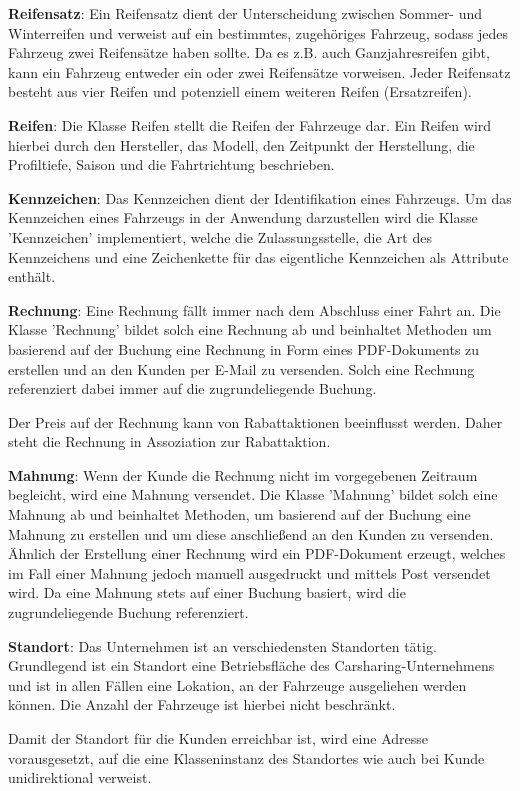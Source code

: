\textbf{Reifensatz}: Ein Reifensatz dient der Unterscheidung zwischen Sommer- und Winterreifen und verweist auf ein bestimmtes, zugehöriges Fahrzeug, sodass jedes Fahrzeug zwei Reifensätze haben sollte. Da es z.B. auch Ganzjahresreifen gibt, kann ein Fahrzeug entweder ein oder zwei Reifensätze vorweisen.  
Jeder Reifensatz besteht aus vier Reifen und potenziell einem weiteren Reifen (Ersatzreifen).

\textbf{Reifen}: Die Klasse Reifen stellt die Reifen der Fahrzeuge dar. Ein Reifen wird hierbei durch den Hersteller, das Modell, den Zeitpunkt der Herstellung, die Profiltiefe, Saison und die Fahrtrichtung beschrieben.

\textbf{Kennzeichen}: Das Kennzeichen dient der Identifikation eines Fahrzeugs. Um das Kennzeichen eines Fahrzeugs in der Anwendung darzustellen wird die Klasse 'Kennzeichen' implementiert, welche die Zulassungsstelle, die Art des Kennzeichens und eine Zeichenkette für das eigentliche Kennzeichen als Attribute enthält.

\textbf{Rechnung}: Eine Rechnung fällt immer nach dem Abschluss einer Fahrt an. Die Klasse 'Rechnung' bildet solch eine Rechnung ab und beinhaltet Methoden um basierend auf der Buchung eine Rechnung in Form eines PDF-Dokuments zu erstellen und an den Kunden per E-Mail zu versenden. Solch eine Rechnung referenziert dabei immer auf die zugrundeliegende Buchung.

Der Preis auf der Rechnung kann von Rabattaktionen beeinflusst werden. Daher steht die Rechnung in Assoziation zur Rabattaktion.

\textbf{Mahnung}: Wenn der Kunde die Rechnung nicht im vorgegebenen Zeitraum begleicht, wird eine Mahnung versendet. Die Klasse 'Mahnung' bildet solch eine Mahnung ab und beinhaltet Methoden, um basierend auf der Buchung eine Mahnung zu erstellen und um diese anschließend an den Kunden zu versenden. Ähnlich der Erstellung einer Rechnung wird ein PDF-Dokument erzeugt, welches im Fall einer Mahnung jedoch manuell ausgedruckt und mittels Post versendet wird. Da eine Mahnung stets auf einer Buchung basiert, wird die zugrundeliegende Buchung referenziert.

\textbf{Standort}: Das Unternehmen ist an verschiedensten Standorten tätig. Grundlegend ist ein Standort eine Betriebsfläche des Carsharing-Unternehmens und ist in allen Fällen eine Lokation, an der Fahrzeuge ausgeliehen werden können. Die Anzahl der Fahrzeuge ist hierbei nicht beschränkt.

Damit der Standort für die Kunden erreichbar ist, wird eine Adresse vorausgesetzt, auf die eine Klasseninstanz des Standortes wie auch bei Kunde unidirektional verweist. 

